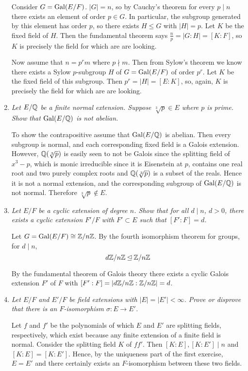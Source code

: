 \documentclass[10pt]{article}
\begin{document}
\begin{enumerate}
Consider $G = \operatorname{Gal}(E/F)$.  $|G| = n$, so by Cauchy's theorem for every $p \mid n$ there exists an element of order $p \in G$.  In particular, the subgroup generated by this element has order $p$, so there exists $H \leq G$ with $|H| = p$.  Let $K$ be the fixed field of $H$.  Then the fundamental theorem says $\frac{n}{p} = |G:H| = [K:F]$, so $K$ is precisely the field for which are are looking.

Now assume that $n = p^rm$ where $p \nmid m$.  Then from Sylow's theorem we know there exists a Sylow $p$-subgroup $H$ of $G = \operatorname{Gal}(E/F)$ of order $p^r$.  Let $K$ be the fixed field of this subgroup.  Then $p^r = |H| = [E:K]$, so, again, $K$ is precisely the field for which are are looking.

\item \emph{Let $E/\mathbb{Q}$ be a finite normal extension.  Suppose $\sqrt[3]{p} \in E$ where $p$ is prime.  Show that $\operatorname{Gal}(E/\mathbb{Q})$ is not abelian.}

To show the contrapositive assume that $\operatorname{Gal}(E/\mathbb{Q})$ is abelian.  Then every subgroup is normal, and each corresponding fixed field is a Galois extension.  However, $\mathbb{Q}(\sqrt[3]{p})$ is easily seen to not be Galois since the splitting field of $x^3 - p$, which is monic irreducible since it is Eisenstein at $p$, contains one real root and two purely complex roots and $\mathbb{Q}(\sqrt[3]{p})$ is a subset of the reals.  Hence it is not a normal extension, and the corresponding subgroup of $\operatorname{Gal}(E/\mathbb{Q})$ is not normal.  Therefore $\sqrt[3]{p} \notin E$.

\item \emph{Let $E/F$ be a cyclic extension of degree $n$.  Show that for all $d \mid n$, $d > 0$, there exists a cyclic extension $F'/F$ with $F' \subset E$ such that $[F':F] = d$.}

Let $G = \operatorname{Gal}(E/F) \cong \mathbb{Z}/n\mathbb{Z}$.  By the fourth isomorphism theorem for groups, for $d \mid n$,
\[
d\mathbb{Z}/n\mathbb{Z} \unlhd \mathbb{Z}/n\mathbb{Z}
\]

By the fundamental theorem of Galois theory there exists a cyclic Galois extension $F'$ of $F$ with $[F':F] = \left| d\mathbb{Z}/n\mathbb{Z} : \mathbb{Z}/n\mathbb{Z} \right| = d$.

\item \emph{Let $E/F$ and $E'/F$ be field extensions with $|E| = |E'| < \infty$.  Prove or disprove that there is an $F$-isomorphism $\sigma: E \rightarrow E'$.}

Let $f$ and $f'$ be the polynomials of which $E$ and $E'$ are splitting fields, respectively, which exist because any finite extension of a finite field is normal.  Consider the splitting field $K$ of $ff'$.  Then $[K:E], [K:E'] \mid n$ and $[K:E] = [K:E']$.  Hence, by the uniqueness part of the first exercise, $E = E'$ and there certainly exists an $F$-isomorphism between these two fields.


\end{enumerate}
\end{document}
